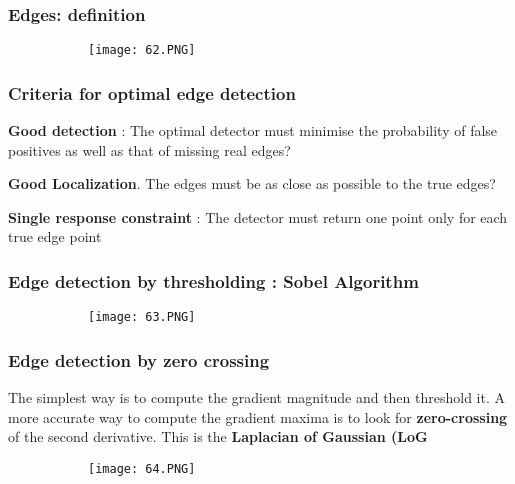 \documentclass{article}
\begin{document}
\subsubsection{Edges: definition}

\begin{figure}[ht!]
  \centering
  \begin{subfigure}[b]{0.7\linewidth}
    \texttt{[image: 62.PNG]}
  \end{subfigure}
\end{figure}

\subsubsection{Criteria for optimal edge detection}

\textbf{Good detection} : The optimal detector must minimise the probability of false positives as well as that of missing real edges?

\textbf{Good Localization}. The edges must be as close as possible to the true edges?

\textbf{Single response constraint} : The detector must return one point only for each true edge point

\vspace{30mm}

\subsubsection{Edge detection by thresholding : Sobel Algorithm}

\begin{figure}[ht!]
  \centering
  \begin{subfigure}[b]{0.45\linewidth}
    \texttt{[image: 63.PNG]}
  \end{subfigure}
\end{figure}

\subsubsection{Edge detection by zero crossing}

The simplest way is to compute the gradient magnitude and then threshold it.
A more accurate way to compute the gradient maxima is to look for \textbf{zero-crossing} of the second derivative.
This is the \textbf{Laplacian of Gaussian (LoG}

\begin{figure}[ht!]
  \centering
  \begin{subfigure}[b]{0.45\linewidth}
    \texttt{[image: 64.PNG]}
  \end{subfigure}
\end{figure}
\end{document}
